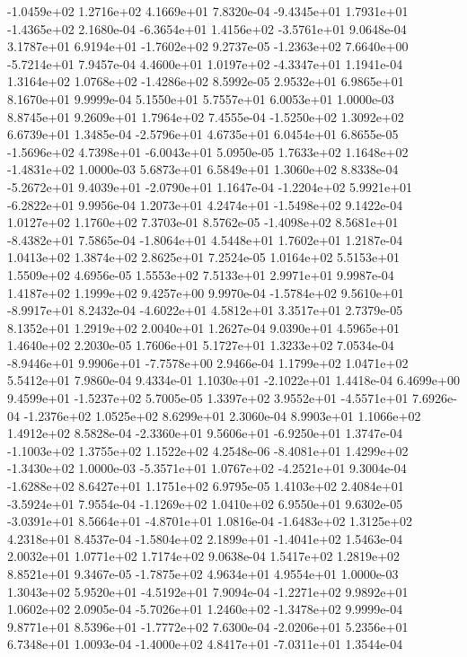 -1.0459e+02  1.2716e+02  4.1669e+01  7.8320e-04
-9.4345e+01  1.7931e+01 -1.4365e+02  2.1680e-04
-6.3654e+01  1.4156e+02 -3.5761e+01  9.0648e-04
 3.1787e+01  6.9194e+01 -1.7602e+02  9.2737e-05
-1.2363e+02  7.6640e+00 -5.7214e+01  7.9457e-04
 4.4600e+01  1.0197e+02 -4.3347e+01  1.1941e-04
 1.3164e+02  1.0768e+02 -1.4286e+02  8.5992e-05
2.9532e+01 6.9865e+01 8.1670e+01  9.9999e-04
5.1550e+01 5.7557e+01 6.0053e+01  1.0000e-03
8.8745e+01 9.2609e+01 1.7964e+02  7.4555e-04
-1.5250e+02  1.3092e+02  6.6739e+01  1.3485e-04
-2.5796e+01  4.6735e+01  6.0454e+01  6.8655e-05
-1.5696e+02  4.7398e+01 -6.0043e+01  5.0950e-05
 1.7633e+02  1.1648e+02 -1.4831e+02  1.0000e-03
5.6873e+01 6.5849e+01 1.3060e+02  8.8338e-04
-5.2672e+01  9.4039e+01 -2.0790e+01  1.1647e-04
-1.2204e+02  5.9921e+01 -6.2822e+01  9.9956e-04
 1.2073e+01  4.2474e+01 -1.5498e+02  9.1422e-04
1.0127e+02 1.1760e+02 7.3703e-01  8.5762e-05
-1.4098e+02  8.5681e+01 -8.4382e+01  7.5865e-04
-1.8064e+01  4.5448e+01  1.7602e+01  1.2187e-04
1.0413e+02 1.3874e+02 2.8625e+01  7.2524e-05
1.0164e+02 5.5153e+01 1.5509e+02  4.6956e-05
1.5553e+02 7.5133e+01 2.9971e+01  9.9987e-04
1.4187e+02 1.1999e+02 9.4257e+00  9.9970e-04
-1.5784e+02  9.5610e+01 -8.9917e+01  8.2432e-04
-4.6022e+01  4.5812e+01  3.3517e+01  2.7379e-05
8.1352e+01 1.2919e+02 2.0040e+01  1.2627e-04
9.0390e+01 4.5965e+01 1.4640e+02  2.2030e-05
1.7606e+01 5.1727e+01 1.3233e+02  7.0534e-04
-8.9446e+01  9.9906e+01 -7.7578e+00  2.9466e-04
1.1799e+02 1.0471e+02 5.5412e+01  7.9860e-04
 9.4334e-01  1.1030e+01 -2.1022e+01  1.4418e-04
 6.4699e+00  9.4599e+01 -1.5237e+02  5.7005e-05
 1.3397e+02  3.9552e+01 -4.5571e+01  7.6926e-04
-1.2376e+02  1.0525e+02  8.6299e+01  2.3060e-04
8.9903e+01 1.1066e+02 1.4912e+02  8.5828e-04
-2.3360e+01  9.5606e+01 -6.9250e+01  1.3747e-04
-1.1003e+02  1.3755e+02  1.1522e+02  4.2548e-06
-8.4081e+01  1.4299e+02 -1.3430e+02  1.0000e-03
-5.3571e+01  1.0767e+02 -4.2521e+01  9.3004e-04
-1.6288e+02  8.6427e+01  1.1751e+02  6.9795e-05
 1.4103e+02  2.4084e+01 -3.5924e+01  7.9554e-04
-1.1269e+02  1.0410e+02  6.9550e+01  9.6302e-05
-3.0391e+01  8.5664e+01 -4.8701e+01  1.0816e-04
-1.6483e+02  1.3125e+02  4.2318e+01  8.4537e-04
-1.5804e+02  2.1899e+01 -1.4041e+02  1.5463e-04
2.0032e+01 1.0771e+02 1.7174e+02  9.0638e-04
1.5417e+02 1.2819e+02 8.8521e+01  9.3467e-05
-1.7875e+02  4.9634e+01  4.9554e+01  1.0000e-03
 1.3043e+02  5.9520e+01 -4.5192e+01  7.9094e-04
-1.2271e+02  9.9892e+01  1.0602e+02  2.0905e-04
-5.7026e+01  1.2460e+02 -1.3478e+02  9.9999e-04
 9.8771e+01  8.5396e+01 -1.7772e+02  7.6300e-04
-2.0206e+01  5.2356e+01  6.7348e+01  1.0093e-04
-1.4000e+02  4.8417e+01 -7.0311e+01  1.3544e-04
